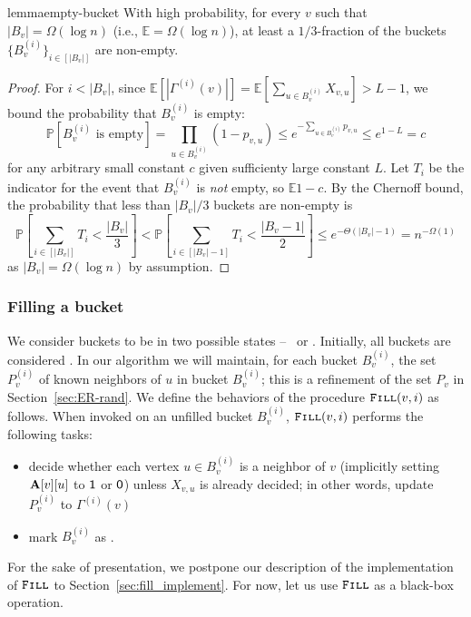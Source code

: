 \begin{restatable}{lemma}{empty-bucket}
\label{lem:empty_bucket}
With high probability, for every $v$ such that $|B_v| = \Omega(\log n)$ (i.e., $\mathbb E = \Omega(\log n)$), at least a $1/3$-fraction of the buckets $\{B_v^{(i)}\}_{i\in[|B_v|]}$ are non-empty.
\end{restatable}
\begin{proof}
For $i < |B_v|$, since $ \mathbb{E} \left[ |\Gamma^{(i)}(v)| \right] =\mathbb{E} \left[ \sum_{u\in B_v^{(i)}} X_{v,u} \right] > L-1$, we bound the probability that $B_v^{(i)}$ is empty:
$$\mathbb P[B_v^{(i)}\textrm{ is empty}] = \prod_{u\in B_v^{(i)}} (1-p_{v,u}) \leq e^{-\sum_{u\in B_v^{(i)}} p_{v,u}} \leq e^{1-L}=c
$$
for any arbitrary small constant $c$ given sufficienty large constant $L$. Let $T_{i}$ be the indicator for the event that $B_v^{(i)}$ is \emph{not} empty, so $\mathbb E 1-c$. By the Chernoff bound, the probability that less than $|B_v|/3$ buckets are non-empty is 
$$\textstyle
\mathbb P\left[\sum_{i\in[|B_v|]} T_i<\frac{|B_v|}{3}\right]<\mathbb P\left[\sum_{i\in[|B_v|-1]} T_i<\frac{|B_v-1|}{2}\right]\leq e^{-\Theta(|B_v|-1)} = n^{-\Omega(1)}
$$ as $|B_v| = \Omega(\log n)$ by assumption.
\end{proof}




\subsubsection{Filling a bucket}
\label{sec:bucket_filling}

We consider buckets to be in two possible states -- \filled~or \unfilled.
Initially, all buckets are considered \unfilled.
In our algorithm we will maintain, for each bucket $B^{(i)}_v$, the set $P^{(i)}_v$ of known neighbors of $u$ in bucket $B^{(i)}_v$; this is a refinement of the set $P_v$ in Section~\ref{sec:ER-rand}. 
We define the behaviors of the procedure $\texttt{\textsc{Fill}}(v,i)$ as follows. When invoked on an unfilled bucket $B_v^{(i)}$, $\texttt{\textsc{Fill}}(v,i)$ performs the following tasks:
\begin{itemize}
\item decide whether each vertex $u \in B_v^{(i)}$ is a neighbor of $v$ (implicitly setting $\mathbf{A}[v][u]$ to $\mathsf{1}$ or $\mathsf{0}$) unless $X_{v,u}$ is already decided; in other words, update $P_v^{(i)}$ to $\Gamma^{(i)}(v)$
\item mark $B_v^{(i)}$ as \filled.
\end{itemize}
For the sake of presentation, we postpone our description of the implementation of $\texttt{\textsc{Fill}}$ to Section~\ref{sec:fill_implement}. For now, let us use $\texttt{\textsc{Fill}}$ as a black-box operation.





